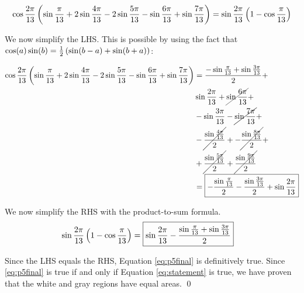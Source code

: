 \documentclass[10pt]{../usamts}
\begin{document}
\begin{solution}
\begin{equation}
    \cos{{\frac{2\pi}{13}}}\left( \sin{{\frac{\pi}{13}}} + 2\sin{{\frac{4\pi}{13}}} - 2\sin{{\frac{5\pi}{13}}} - \sin{{\frac{6\pi}{13}}} + \sin{{\frac{7\pi}{13}}} \right)
    = \sin{{\frac{2\pi}{13}}}\left( 1 - \cos{{\frac{\pi}{13}}} \right)
    \label{eq:p5final}
\end{equation}

We now simplify the LHS. This is possible by using the fact that $\cos(a)\sin(b) = \frac{1}{2}\left( \sin(b-a) + \sin(b+a) \right)$:

\begin{align*}
    \cos{{\frac{2\pi}{13}}}\left( \sin{{\frac{\pi}{13}}} + 2\sin{{\frac{4\pi}{13}}} - 2\sin{{\frac{5\pi}{13}}} - \sin{{\frac{6\pi}{13}}} + \sin{{\frac{7\pi}{13}}} \right)
    &= \frac{-\sin{{\frac{\pi}{13}}} + \sin{{\frac{3\pi}{13}}}}{2} + \\
    &\sin{{\frac{2\pi}{13}}} + \cancel{\sin{{\frac{6\pi}{13}}}} + \\
    &- \sin{{\frac{3\pi}{13}}} -\cancel{\sin{{\frac{7\pi}{13}}}} + \\
    &-\cancel{\frac{\sin{{\frac{4\pi}{13}}}}{2}} + -\cancel{\frac{\sin{{\frac{8\pi}{13}}}}{2}} +\\
    &+ \cancel{\frac{\sin{{\frac{5\pi}{13}}}}{2}} + \cancel{\frac{\sin{{\frac{9\pi}{13}}}}{2}} \\
    &= \boxed{-\frac{\sin{{\frac{\pi}{13}}}}{2} - \frac{\sin{{\frac{3\pi}{13}}}}{2} + \sin{{\frac{2\pi}{13}}}}
\end{align*}

We now simplify the RHS with the product-to-sum formula.
\begin{align*}
    \sin{{\frac{2\pi}{13}}}\left( 1 - \cos{{\frac{\pi}{13}}} \right)
    &= \boxed{\sin{{\frac{2\pi}{13}}} - \frac{\sin{{\frac{\pi}{13}}} + \sin{{\frac{3\pi}{13}}}}{2}}
\end{align*}

Since the LHS equals the RHS, Equation \ref{eq:p5final} is definitively true. Since \ref{eq:p5final} is true if and only if Equation \ref{eq:statement} is true, we have proven that the white and gray regions have equal areas.
\qed
\end{solution}
\end{document}
